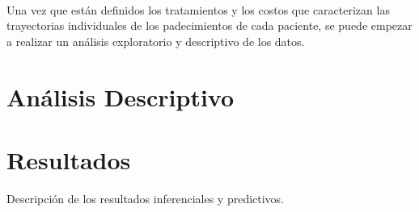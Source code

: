 \\
Una vez que est\'an definidos los tratamientos y los costos que caracterizan las trayectorias individuales de los padecimientos de cada paciente, se puede empezar a realizar un an\'alisis exploratorio y descriptivo de los datos.
\section{An\'alisis Descriptivo}

\section{Resultados}
Descripci\'on de los resultados inferenciales y predictivos.